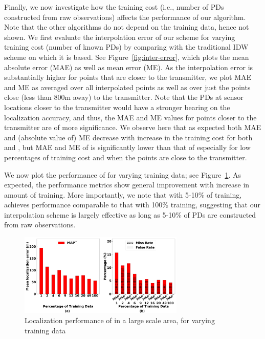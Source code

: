   Finally, we now investigate how the
training cost (i.e., number of PDs constructed from raw observations)
affects the performance of our \ouralgo algorithm. Note that the other
algorithms do not depend on the training data, hence not shown.
We first evaluate the interpolation error of our \ildw scheme for
varying training cost (number of known PDs) by comparing with the
traditional IDW scheme on which it is based. See
Figure~\ref{fig:inter-error}, which plots the mean absolute error
(MAE) as well as mean error (ME). As the interpolation error is
substantially higher for points that are closer to the transmitter, we
plot MAE and ME as averaged over all interpolated points as well as
over just the points close (less than 800m away) to the transmitter. Note
that the PDs at sensor locations closer to the transmitter would have
a stronger bearing on the localization accuracy, and thus, the MAE and
ME values for points closer to the transmitter are of more
significance.
We observe here that as expected both MAE and (absolute value of) ME
decrease with increase in the training cost for both \idw and \ildw,
but MAE and ME of \ildw is significantly lower than that of \idw
especially for low percentages of training cost and when the points
are close to the transmitter.

We now plot the performance of \ouralgo for varying training data; see
Figure~\ref{fig:varying-training-data}. As expected, the performance
metrics show general improvement with increase in amount of
training. More importantly, we note that with 5-10\% of training,
\ouralgo achieves performance comparable to that with 100\% training,
suggesting that our interpolation scheme is largely effective as long
as 5-10\% of PDs are constructed from raw observations. 



\begin{figure}[ht]
	\centering
	\includegraphics[width=0.7\textwidth]{chapters/ipsn/figures/splat-vary-training.png}
	\caption{Localization performance of \ouralgo in a large scale area, for varying training data}
	\label{fig:varying-training-data}
\end{figure}

